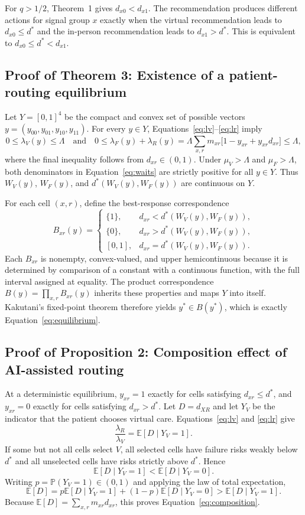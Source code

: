 \documentclass[11pt]{article}
\newcommand{\E}{\mathbb{E}}
\newcommand{\Prb}{\mathbb{P}}
\begin{document}
For $q>1/2$, Theorem~1 gives $d_{x0}<d_{x1}$.  The recommendation produces different actions for signal group $x$ exactly when the virtual recommendation leads to $d_{x0}\leq d^*$ and the in-person recommendation leads to $d_{x1}>d^*$.  This is equivalent to $d_{x0}\leq d^*<d_{x1}$.

\subsection{Proof of Theorem 3: Existence of a patient-routing equilibrium}

Let $Y=[0,1]^4$ be the compact and convex set of possible vectors $y=(y_{00},y_{01},y_{10},y_{11})$.  For every $y\in Y$, Equations~\eqref{eq:lv}--\eqref{eq:lr} imply
\[
 0\leq\lambda_V(y)\leq\Lambda
\quad\text{and}\quad
 0\leq\lambda_F(y)+\lambda_R(y)
 =\Lambda\sum_{x,r}m_{xr}\bigl[1-y_{xr}+y_{xr}d_{xr}\bigr]\leq\Lambda,
\]
where the final inequality follows from $d_{xr}\in(0,1)$.  Under $\mu_V>\Lambda$ and $\mu_F>\Lambda$, both denominators in Equation~\eqref{eq:waits} are strictly positive for all $y\in Y$.  Thus $W_V(y)$, $W_F(y)$, and $d^*(W_V(y),W_F(y))$ are continuous on $Y$.

For each cell $(x,r)$, define the best-response correspondence
\[
 B_{xr}(y)=
 \begin{cases}
 \{1\},& d_{xr}<d^*(W_V(y),W_F(y)),\\
 \{0\},& d_{xr}>d^*(W_V(y),W_F(y)),\\
 [0,1],& d_{xr}=d^*(W_V(y),W_F(y)).
 \end{cases}
\]
Each $B_{xr}$ is nonempty, convex-valued, and upper hemicontinuous because it is determined by comparison of a constant with a continuous function, with the full interval assigned at equality.  The product correspondence $B(y)=\prod_{x,r}B_{xr}(y)$ inherits these properties and maps $Y$ into itself.  Kakutani's fixed-point theorem therefore yields $y^*\in B(y^*)$, which is exactly Equation~\eqref{eq:equilibrium}.

\subsection{Proof of Proposition 2: Composition effect of AI-assisted routing}

At a deterministic equilibrium, $y_{xr}=1$ exactly for cells satisfying $d_{xr}\leq d^*$, and $y_{xr}=0$ exactly for cells satisfying $d_{xr}>d^*$.  Let $D=d_{XR}$ and let $Y_V$ be the indicator that the patient chooses virtual care.  Equations~\eqref{eq:lv} and \eqref{eq:lr} give
\[
 \frac{\lambda_R}{\lambda_V}=\E[D\mid Y_V=1].
\]
If some but not all cells select $V$, all selected cells have failure risks weakly below $d^*$ and all unselected cells have risks strictly above $d^*$.  Hence
\[
 \E[D\mid Y_V=1]<\E[D\mid Y_V=0].
\]
Writing $p=\Prb(Y_V=1)\in(0,1)$ and applying the law of total expectation,
\[
 \E[D]=p\E[D\mid Y_V=1]+(1-p)\E[D\mid Y_V=0]
 >\E[D\mid Y_V=1].
\]
Because $\E[D]=\sum_{x,r}m_{xr}d_{xr}$, this proves Equation~\eqref{eq:composition}.
\end{document}
